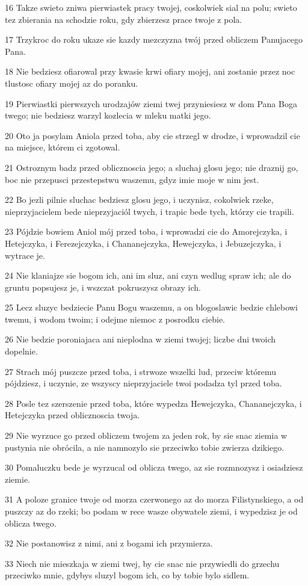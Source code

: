 \par 16 Takze swieto zniwa pierwiastek pracy twojej, coskolwiek sial na polu; swieto tez zbierania na schodzie roku, gdy zbierzesz prace twoje z pola.
\par 17 Trzykroc do roku ukaze sie kazdy mezczyzna twój przed obliczem Panujacego Pana.
\par 18 Nie bedziesz ofiarowal przy kwasie krwi ofiary mojej, ani zostanie przez noc tlustosc ofiary mojej az do poranku.
\par 19 Pierwiastki pierwszych urodzajów ziemi twej przyniesiesz w dom Pana Boga twego; nie bedziesz warzyl kozlecia w mleku matki jego.
\par 20 Oto ja posylam Aniola przed toba, aby cie strzegl w drodze, i wprowadzil cie na miejsce, którem ci zgotowal.
\par 21 Ostroznym badz przed oblicznoscia jego; a sluchaj glosu jego; nie draznij go, boc nie przepusci przestepstwu waszemu, gdyz imie moje w nim jest.
\par 22 Bo jezli pilnie sluchac bedziesz glosu jego, i uczynisz, cokolwiek rzeke, nieprzyjacielem bede nieprzyjaciól twych, i trapic bede tych, którzy cie trapili.
\par 23 Pójdzie bowiem Aniol mój przed toba, i wprowadzi cie do Amorejczyka, i Hetejczyka, i Ferezejczyka, i Chananejczyka, Hewejczyka, i Jebuzejczyka, i wytrace je.
\par 24 Nie klaniajze sie bogom ich, ani im sluz, ani czyn wedlug spraw ich; ale do gruntu popsujesz je, i wszczat pokruszysz obrazy ich.
\par 25 Lecz sluzyc bedziecie Panu Bogu waszemu, a on blogoslawic bedzie chlebowi twemu, i wodom twoim; i odejme niemoc z posrodku ciebie.
\par 26 Nie bedzie poroniajaca ani nieplodna w ziemi twojej; liczbe dni twoich dopelnie.
\par 27 Strach mój puszcze przed toba, i strwoze wszelki lud, przeciw któremu pójdziesz, i uczynie, ze wszyscy nieprzyjaciele twoi podadza tyl przed toba.
\par 28 Posle tez szerszenie przed toba, które wypedza Hewejczyka, Chananejczyka, i Hetejczyka przed oblicznoscia twoja.
\par 29 Nie wyrzuce go przed obliczem twojem za jeden rok, by sie snac ziemia w pustynia nie obrócila, a nie namnozylo sie przeciwko tobie zwierza dzikiego.
\par 30 Pomaluczku bede je wyrzucal od oblicza twego, az sie rozmnozysz i osiadziesz ziemie.
\par 31 A poloze granice twoje od morza czerwonego az do morza Filistynskiego, a od puszczy az do rzeki; bo podam w rece wasze obywatele ziemi, i wypedzisz je od oblicza twego.
\par 32 Nie postanowisz z nimi, ani z bogami ich przymierza.
\par 33 Niech nie mieszkaja w ziemi twej, by cie snac nie przywiedli do grzechu przeciwko mnie, gdybys sluzyl bogom ich, co by tobie bylo sidlem.

